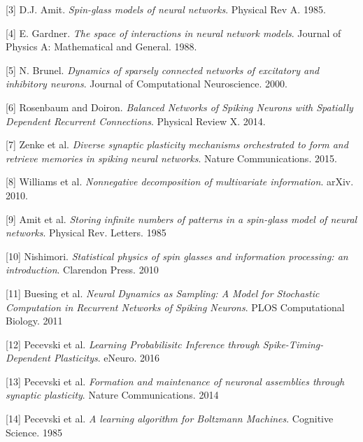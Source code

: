 \documentclass{ucetd}
\begin{document}
[3] D.J. Amit. \textit{Spin-glass models of neural networks}. Physical Rev A. 1985.

[4] E. Gardner. \textit{The space of interactions in neural network models}. Journal of Physics A: Mathematical and General. 1988.

[5] N. Brunel. \textit{Dynamics of sparsely connected networks of excitatory and inhibitory neurons}. Journal of Computational Neuroscience. 2000. 

[6] Rosenbaum and Doiron. \textit{Balanced Networks of Spiking Neurons with Spatially Dependent Recurrent Connections}. Physical Review X. 2014.

[7] Zenke et al. \textit{Diverse synaptic plasticity mechanisms
orchestrated to form and retrieve memories
in spiking neural networks}. Nature Communications. 2015.

[8] Williams et al. \textit{Nonnegative decomposition of multivariate information}. arXiv. 2010.

[9] Amit et al. \textit{Storing infinite numbers of patterns in a spin-glass model of neural networks}. Physical Rev. Letters. 1985

[10] Nishimori. \textit{Statistical physics of spin glasses and information processing: an introduction}. Clarendon Press. 2010

[11] Buesing et al. \textit{Neural Dynamics as Sampling: A Model for Stochastic Computation in Recurrent Networks of Spiking Neurons}. PLOS Computational Biology. 2011

[12] Pecevski et al. \textit{Learning Probabilisitc Inference through Spike-Timing-Dependent Plasticitys}. eNeuro. 2016

[13] Pecevski et al. \textit{Formation and maintenance of neuronal assemblies through synaptic plasticity}. Nature Communications. 2014

[14] Pecevski et al. \textit{A learning algorithm for Boltzmann Machines}. Cognitive Science. 1985

%
%
\end{document}
